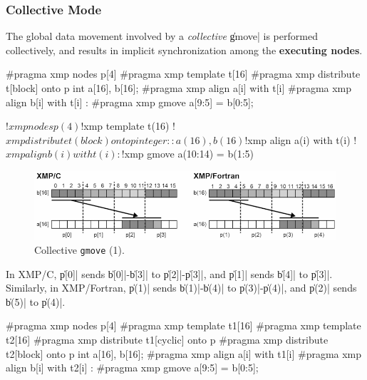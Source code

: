 \subsubsection{Collective Mode}



The global data movement involved by a {\it collective} \|gmove| is performed
collectively, and results in implicit synchronization among the 
{\bf executing nodes}.

\begin{XCexample}
#pragma xmp nodes p[4]
#pragma xmp template t[16]
#pragma xmp distribute t[block] onto p
int a[16], b[16];
#pragma xmp align a[i] with t[i]
#pragma xmp align b[i] with t[i]
     :
#pragma xmp gmove
  a[9:5] = b[0:5];
\end{XCexample}

\begin{XFexample}
!$xmp nodes p(4)
!$xmp template t(16)
!$xmp distribute t(block) onto p
integer :: a(16), b(16)
!$xmp align a(i) with t(i)
!$xmp align b(i) with t(i)
     :
!$xmp gmove
  a(10:14) = b(1:5)
\end{XFexample}

\begin{figure}
  \centering
  \includegraphics[width=\textwidth]{figs/gmove.png}
  \caption{Collective {\tt gmove} (1).}
\end{figure}

In XMP/C, \|p[0]| sends \|b[0]|-\|b[3]| to \|p[2]|-\|p[3]|, and \|p[1]|
sends \|b[4]| to \|p[3]|. Similarly, in XMP/Fortran, \|p(1)| sends
\|b(1)|-\|b(4)| to \|p(3)|-\|p(4)|, and \|p(2)| sends \|b(5)| to \|p(4)|.

\begin{XCexample}
#pragma xmp nodes p[4]
#pragma xmp template t1[16]
#pragma xmp template t2[16]
#pragma xmp distribute t1[cyclic] onto p
#pragma xmp distribute t2[block] onto p
int a[16], b[16];
#pragma xmp align a[i] with t1[i]
#pragma xmp align b[i] with t2[i]
     :
#pragma xmp gmove
  a[9:5] = b[0:5];
\end{XCexample}

